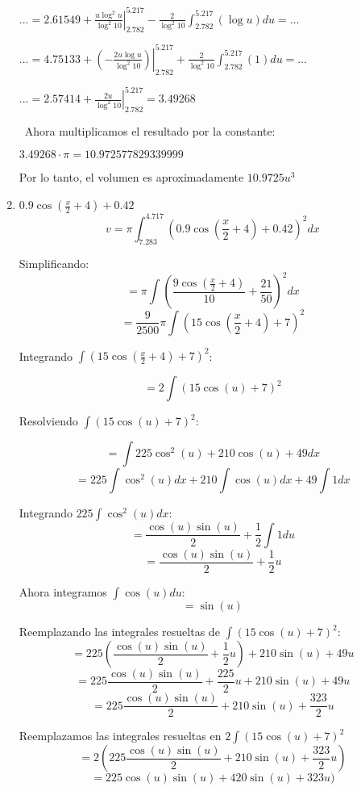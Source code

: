 \documentclass{article}
\begin{document}
\begin{enumerate}
        $... = 2.61549 + \left . \frac{u\log^2{u}}{\log^2{10}} \right |_{2.782}^{5.217} - 
        \frac{2}{\log^2{10}}\displaystyle\int_{2.782}^{5.217}(\log{u})du = ...$\vspace{.3cm}

        $... = 4.75133 + \left . (-\frac{2u\log{u}}{\log^2{10}}) \right |_{2.782}^{5.217} + 
        \frac{2}{\log^2{10}}\displaystyle\int_{2.782}^{5.217}(1)du = ...$\vspace{.3cm}

        $... = 2.57414 + \left . \frac{2u}{\log^2{10}} \right |_{2.782}^{5.217} = 3.49268$
        
        
       \ Ahora multiplicamos el resultado por la constante:
       
       
        $3.49268\cdot \pi=10.972577829339999$
        
        Por lo tanto, el volumen es aproximadamente $10.9725 u^3$
    
    \pagebreak
    
    \item $0.9 \cos \left(\frac{x}{2}+4\right)+0.42$
    $$ v = \pi \int_{7.283}^{4.717} (0.9 \cos \left(\frac{x}{2}+4\right)+0.42)^2 dx$$
    
    Simplificando:
    $$ = \pi \int (\dfrac{9\cos\left(\frac{x}{2}+4\right)}{10}+\dfrac{21}{50})^2 dx$$
    $$ =  \frac{9}{2500} \pi \int (15 \cos(\frac{x}{2} + 4) + 7)^2$$
    
    Integrando $\int (15 \cos(\frac{x}{2} + 4) + 7)^2$:
    
    $$ =  2 \int (15 \cos(u) + 7)^2$$
    
    Resolviendo $\int (15 \cos(u) + 7)^2$:
    
    $$ = \int 225 \cos^2(u) + 210 \cos(u) + 49 dx$$
    $$ = 225 \int \cos^2(u) dx + 210 \int \cos(u) dx + 49 \int 1 dx$$
    
    Integrando $225 \int \cos^2(u) dx$:
    $$ = \frac{\cos(u) \sin(u)}{2} + \frac{1}{2} \int 1 du$$
    $$  =\frac{\cos(u) \sin(u)}{2} + \frac{1}{2} u$$
    
    Ahora integramos $ \int \cos(u) du $:
    $$ = \sin(u) $$
    
    Reemplazando las integrales resueltas de $\int (15 \cos(u) + 7)^2$:
    $$ = 225(\frac{\cos(u) \sin(u)}{2} + \frac{1}{2} u ) + 210\sin(u) + 49 u$$
    $$ = 225\frac{\cos(u) \sin(u)}{2} + \frac{225}{2} u + 210\sin(u) + 49 u$$
    $$ = 225\frac{\cos(u) \sin(u)}{2} + 210\sin(u) + \frac{323}{2} u$$
    
    Reemplazamos las integrales resueltas en $ 2 \int (15 \cos(u) + 7)^2 $
    $$ = 2(225\frac{\cos(u) \sin(u)}{2} + 210\sin(u) + \frac{323}{2} u )$$
    $$ = 225\cos(u) \sin(u)+ 420\sin(u) + 323 u )$$
    

\end{enumerate}
\end{document}
